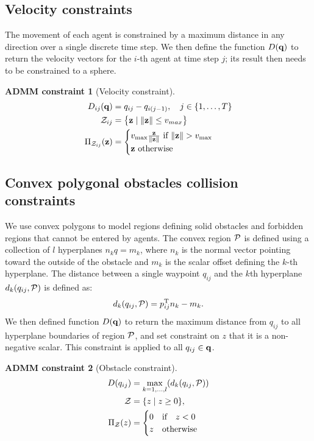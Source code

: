 \documentclass[journal]{IEEEtran}  %
\newtheorem{constraint}{ADMM constraint}
\def\sZ{\mathcal{Z}}
\begin{document}
\subsection{Velocity constraints}\label{sec:velocity-constraint}
  The movement of each agent is constrained by a maximum distance in any direction over a single discrete time step. We then define the function $D(\mathbf{q})$ to return the velocity vectors for the $i$-th agent at time step $j$; its result then needs to be constrained to a sphere.

  \begin{constraint}[Velocity constraint]
\begin{align}
     D_{ij}(\vq) &= q_{ij}-q_{i(j-1)}, \quad j\in\{1,\ldots, T\}\\
\label{eq:velocity_constraint}
   \sZ_{ij} &=\bigl\{\vz \mid \norm{\vz} \leq v_{max}\bigr\}\\
   \Pi_{\sZ_{ij}}(\vz)&=\begin{cases}
   v_{\max}\frac{\vz}{\norm{\vz}} \textrm{ if } \norm{\vz}>v_{\max}\\
   \vz\textrm{ otherwise}
   \end{cases}
\end{align}
\end{constraint}

\subsection{Convex polygonal obstacles collision constraints} \label{sec:obstacle-constraint}

We use convex polygons to model regions defining solid obstacles and forbidden regions that cannot be entered by agents. The convex region $\mathcal{P}$ is defined using a collection of $l$ hyperplanes $n_{k} q = m_{k}$, where $n_k$ is the normal vector pointing toward the outside of the obstacle and $m_k$ is the scalar offset defining the $k$-th hyperplane. The distance between a single waypoint $q_{ij}$ and the $k$th hyperplane $d_{k}(q_{ij},\mathcal{P})$ is defined as:
\begin{equation}
    d_{k}(q_{ij},\mathcal{P})= p_{ij}^\mathrm{T} n_k - m_k.
\end{equation}
We then defined function $D(\mathbf{q})$ to return the maximum distance from $q_{ij}$ to all hyperplane boundaries of region $\mathcal{P}$, and set constraint on $z$ that it is a non-negative scalar. This constraint is applied to all $q_{ij} \in \mathbf{q}$. 

\begin{constraint}[Obstacle constraint]
\begin{align}
     	D(q_{ij}) &= \max_{k=1,\dots,l} (d_{k}(q_{ij},\cP))\\
\label{eq:obstacle_constraint}
  \sZ &= \{z \mid z \geq 0 \},\\
   \Pi_\sZ(z) & = \begin{cases}
   0 & \textrm{if} \quad z < 0\\
   z  & \textrm{otherwise}
   \end{cases} \label{eq:zoneConstraintProjection}
\end{align}
\end{constraint}
\end{document}
